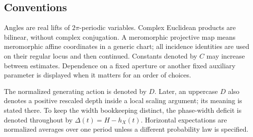 \subsection{Conventions}

Angles are real lifts of \(2\pi\)-periodic variables. Complex Euclidean
products are bilinear, without complex conjugation. A meromorphic
projective map means meromorphic affine coordinates in a generic chart;
all incidence identities are used on their regular locus and then
continued. Constants denoted by \(C\) may increase between estimates.
Dependence on a fixed aperture or another fixed auxiliary parameter is
displayed when it matters for an order of choices.

The normalized generating action is denoted by \(D\). Later, an uppercase
\(D\) also denotes a positive rescaled depth inside a local scaling
argument; its meaning is stated there. To keep the width bookkeeping
distinct, the phase-width deficit is denoted throughout by
\(\Delta(t)=H-h_X(t)\). Horizontal expectations are normalized averages
over one period unless a different probability law is specified.
